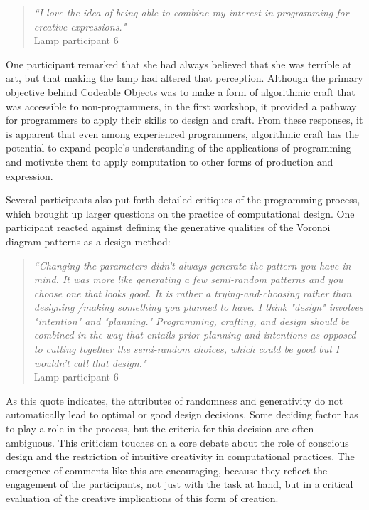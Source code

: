 \begin{quotation}
\textit{``I love the idea of being able to combine my interest in programming for creative expressions."}
\\Lamp participant 6
\end{quotation}

One participant remarked that she had always believed that she was terrible at art, but that making the lamp had altered that perception. Although the primary objective behind Codeable Objects was to make a form of algorithmic craft that was accessible to non-programmers, in the first workshop, it provided a pathway for programmers to apply their skills to design and craft. From these responses, it is apparent that even among experienced programmers, algorithmic craft has the potential to expand people's understanding of the applications of programming and motivate them to apply computation to other forms of production and expression.

Several participants also put forth detailed critiques of the programming process, which brought up larger questions on the practice of computational design. One participant reacted against defining the generative qualities of the Voronoi diagram patterns as a design method:
\begin{quotation}
 \textit{``Changing the parameters didn't always generate the pattern you have in mind. It was more like generating a few semi-random patterns and you choose one that looks good. It is rather a trying-and-choosing rather than designing /making something you planned to have. I think "design" involves "intention" and "planning." Programming, crafting, and design should be combined in the way that entails prior planning and intentions as opposed to cutting together the semi-random choices, which could be good but I wouldn't call that design."}
 \\Lamp participant 6
 \end{quotation}
 
As this quote indicates, the attributes of randomness and generativity do not automatically lead to optimal or good design decisions. Some deciding factor has to play a role in the process, but the criteria for this decision are often ambiguous. This criticism touches on a core debate about the role of conscious design and the restriction of intuitive creativity in computational practices. The emergence of comments like this are encouraging, because they reflect the engagement of the participants, not just with the task at hand, but in a critical evaluation of the  creative implications of this form of creation. 

